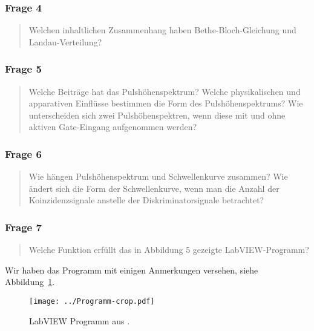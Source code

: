 \documentclass[11pt, ngerman, fleqn, DIV=15, headinclude, BCOR=2cm]{scrreprt}
\begin{document}

\subsubsection{Frage 4}

\begin{quote}
    Welchen inhaltlichen Zusammenhang haben Bethe-Bloch-Gleichung und
    Landau-Verteilung?
\end{quote}


\subsubsection{Frage 5}

\begin{quote}
    Welche Beiträge hat das Pulshöhenspektrum? Welche physikalischen und
    apparativen Einflüsse bestimmen die Form des Pulshöhenspektrums? Wie
    unterscheiden sich zwei Pulshöhenspektren, wenn diese mit und ohne aktiven
    Gate-Eingang aufgenommen werden?
\end{quote}


\subsubsection{Frage 6}

\begin{quote}
    Wie hängen Pulshöhenspektrum und Schwellenkurve zusammen? Wie ändert sich
    die Form der Schwellenkurve, wenn man die Anzahl der Koinzidenzsignale
    anstelle der Diskriminatorsignale betrachtet?
\end{quote}


\subsubsection{Frage 7}

\begin{quote}
    Welche Funktion erfüllt das in Abbildung 5 gezeigte LabVIEW-Programm?
\end{quote}

Wir haben das Programm mit einigen Anmerkungen versehen, siehe
Abbildung~\ref{fig:labview-test}.

\begin{figure}[htbp]
    \centering
    \texttt{[image: ../Programm-crop.pdf]}
    \caption{%
        LabVIEW Programm aus \parencite[Abbildung~5]{physik512-Anleitung}.
    }
    \label{fig:labview-test}
\end{figure}
\end{document}
